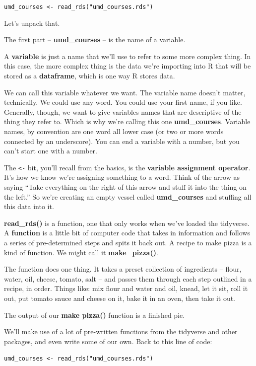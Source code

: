 \documentclass[
  letterpaper,
  DIV=11,
  numbers=noendperiod]{scrreprt}
\begin{document}
\texttt{umd\_courses\ \textless{}-\ read\_rds("umd\_courses.rds")}

Let's unpack that.

The first part -- \textbf{umd\_courses} -- is the name of a variable.

A \textbf{variable} is just a name that we'll use to refer to some more
complex thing. In this case, the more complex thing is the data we're
importing into R that will be stored as a \textbf{dataframe}, which is
one way R stores data.

We can call this variable whatever we want. The variable name doesn't
matter, technically. We could use any word. You could use your first
name, if you like. Generally, though, we want to give variables names
that are descriptive of the thing they refer to. Which is why we're
calling this one \textbf{umd\_courses}. Variable names, by convention
are one word all lower case (or two or more words connected by an
underscore). You can end a variable with a number, but you can't start
one with a number.

The \texttt{\textless{}-} bit, you'll recall from the basics, is the
\textbf{variable assignment operator}. It's how we know we're assigning
something to a word. Think of the arrow as saying ``Take everything on
the right of this arrow and stuff it into the thing on the left.'' So
we're creating an empty vessel called \textbf{umd\_courses} and stuffing
all this data into it.

\textbf{read\_rds()} is a function, one that only works when we've
loaded the tidyverse. A \textbf{function} is a little bit of computer
code that takes in information and follows a series of pre-determined
steps and spits it back out. A recipe to make pizza is a kind of
function. We might call it \textbf{make\_pizza()}.

The function does one thing. It takes a preset collection of ingredients
-- flour, water, oil, cheese, tomato, salt -- and passes them through
each step outlined in a recipe, in order. Things like: mix flour and
water and oil, knead, let it sit, roll it out, put tomato sauce and
cheese on it, bake it in an oven, then take it out.

The output of our \textbf{make pizza()} function is a finished pie.

We'll make use of a lot of pre-written functions from the tidyverse and
other packages, and even write some of our own. Back to this line of
code:

\texttt{umd\_courses\ \textless{}-\ read\_rds("umd\_courses.rds")}
\end{document}
